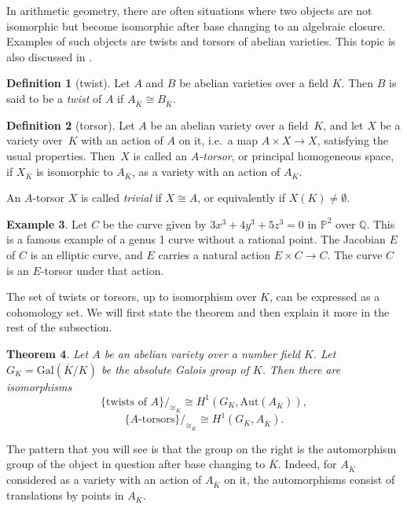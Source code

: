 \documentclass[12pt]{article}
\newtheorem{theorem}{Theorem}[section]
\theoremstyle{definition}
\newtheorem{definition}[theorem]{Definition}
\newtheorem{example}[theorem]{Example}
\numberwithin{equation}{subsection}
\newcommand{\Q}{\ensuremath{\mathbb{Q}}}
\renewcommand{\P}{\ensuremath{\mathbb{P}}}
\begin{document}
In arithmetic geometry, there are often situations where two objects are not isomorphic but become isomorphic after base changing to an algebraic closure.
Examples of such objects are twists and torsors of abelian varieties. This topic is also discussed in \cite[Chap.~X]{SilvermanBook}.

\begin{definition}[twist]
Let $A$ and $B$ be abelian varieties over a field $K$.
Then $B$ is said to be a {\em twist} of $A$ if $A_{\overline{K}} \cong B_{\overline{K}}$.
\end{definition}

\begin{definition}[torsor]
Let $A$ be an abelian variety over a field~$K$, and let $X$ be a variety over~$K$ with an action of $A$ on it, i.e.\ a map $A \times X \to X$, satisfying the usual properties.
Then~$X$ is called an {\em $A$-torsor}, or principal homogeneous space, if $X_{\overline{K}}$ is isomorphic to $A_{\overline{K}}$, as a variety with an action of $A_{\overline{K}}$.

An $A$-torsor $X$ is called {\em trivial} if $X \cong A$, or equivalently if $X(K) \neq \emptyset$.
\end{definition}

\begin{example}\label{ex:torsor}
Let $C$ be the curve given by $3x^3 + 4y^3 + 5z^3 = 0$ in $\P^2$ over $\Q$.
This is a famous example of a genus 1 curve without a rational point.
The Jacobian $E$ of $C$ is an elliptic curve, and $E$ carries a natural action $E \times C \to C$.
The curve $C$ is an $E$-torsor under that action.
\end{example}

The set of twists or torsors, up to isomorphism over $K$, can be expressed as a cohomology set.
We will first state the theorem and then explain it more in the rest of the subsection.

\begin{theorem}\label{thm:h1}
Let $A$ be an abelian variety over a number field $K$. Let $G_K = \mathrm{Gal}(\overline{K}/K)$ be the absolute Galois group of $K$. Then there are isomorphisms
$$\{ \textrm{twists of } A\} /_{\cong_K} \cong H^1(G_K, \mathrm{Aut}(A_{\overline{K}})),$$
$$\{ A\textrm{-torsors}\} /_{\cong_K} \cong H^1(G_K, A_{\overline{K}}).$$
\end{theorem}

The pattern that you will see is that the group on the right is the automorphism group of the object in question after base changing to $\overline{K}$.
Indeed, for $A_{\overline{K}}$ considered as a variety with an action of $A_{\overline{K}}$ on it, the automorphisms consist of translations by points in $A_{\overline{K}}$.
\end{document}

